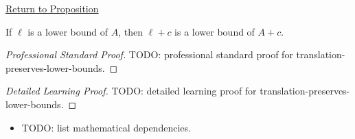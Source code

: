 \newpage
{}
\label{prf:translation-preserves-lower-bounds}

\begin{remark*}[Return]
\hyperref[prop:translation-preserves-lower-bounds]{Return to Proposition}
\end{remark*}

\begin{proposition*}
If $\ell$ is a lower bound of $A$, then $\ell+c$ is a lower bound of $A+c$.
\end{proposition*}

\begin{proof}[Professional Standard Proof]
\LRAProofBodyStart
TODO: professional standard proof for translation-preserves-lower-bounds.
\end{proof}

\begin{proof}[Detailed Learning Proof]
\LRAProofBodyStart
TODO: detailed learning proof for translation-preserves-lower-bounds.
\end{proof}

\begin{remark*}
\end{remark*}

\begin{dependencies}
\begin{itemize}
  \item TODO: list mathematical dependencies.
\end{itemize}
\end{dependencies}

\clearpage
